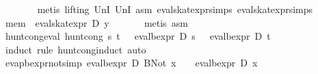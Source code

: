 \begin{isabellebody}
\ \ \ \ \ \ \isamarkupfalse%
\ {}metis\ {}lifting{}\ UnI{}\ UnI{}\ asm{}\ eval{}skat{}expr{}simps{}{}{}\ eval{}skat{}expr{}simps{}{}{}{}\isanewline
\ \ \isamarkupfalse%
\isanewline
\ \ \isamarkupfalse%
\ {}mem\ {}\ eval{}skat{}expr\ D\ y\ {}{}\isanewline
\ \ \ \ \isamarkupfalse%
\ {}metis\ asm{}{}\isanewline
{}\isamarkupfalse%
%
\endisatagproof
{\isafoldproof}%
%
\isadelimproof
\isanewline
%
\endisadelimproof
\isanewline
{}\isamarkupfalse%
\ hunt{}cong{}eval{}\ {}hunt{}cong\ s\ t\ {}\ {}{}{}\ eval{}bexpr\ D\ s\ {}\ {}\ eval{}bexpr\ D\ t\ {}{}\isanewline
%
\isadelimproof
\ \ %
\endisadelimproof
%
\isatagproof
{}\isamarkupfalse%
\ {}induct\ rule{}\ hunt{}cong{}induct{}\ auto{}%
\endisatagproof
{\isafoldproof}%
%
\isadelimproof
\isanewline
%
\endisadelimproof
\isanewline
{}\isamarkupfalse%
\ evap{}bexpr{}not{}simp{}{}\ {}eval{}bexpr\ D\ {}BNot\ x{}\ {}\ {}\ {}{}\ eval{}bexpr\ D\ x\ {}{}{}%

\end{isabellebody}
